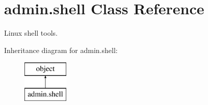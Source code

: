 \hypertarget{classadmin_1_1shell}{\section{admin.\-shell Class Reference}
\label{classadmin_1_1shell}
}


Linux shell tools.  


Inheritance diagram for admin.\-shell\-:\begin{figure}[H]
\begin{center}
\leavevmode
\includegraphics[height=2.000000cm]{de/d16/classadmin_1_1shell}
\end{center}
\end{figure}
